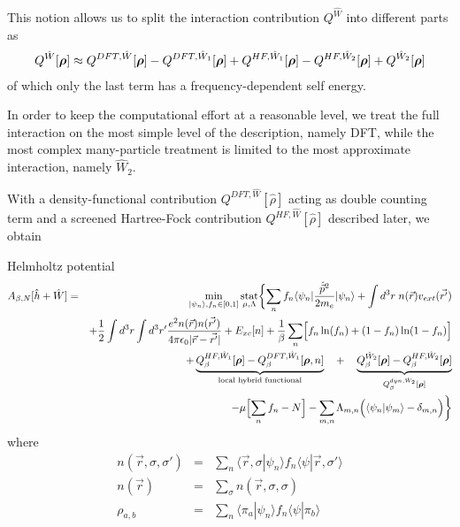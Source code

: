 \documentclass[11pt,a4paper]{report}
\begin{document}
This notion allows us to split the interaction contribution
$Q^{\hat{W}}$ into different parts as
\begin{eqnarray}
Q^{\hat{W}}[\bm{\rho}]
\approx Q^{DFT,\hat{W}}[\bm{\rho}]-Q^{DFT,\hat{W}_1}[\bm{\rho}]
+Q^{HF,\hat{W}_1}[\bm{\rho}]-Q^{HF,\hat{W}_2}[\bm{\rho}]
+Q^{\hat{W}_2}[\bm{\rho}]
\end{eqnarray}
of which only the last term has a frequency-dependent self energy.

In order to keep the computational effort at a reasonable level, we
treat the full interaction on the most simple level of the
description, namely DFT, while the most complex many-particle
treatment is limited to the most approximate interaction, namely
$\hat{W}_2$. 


With a density-functional contribution $Q^{DFT,\hat{W}}[\hat{\rho}]$
acting as double counting term and a screened Hartree-Fock
contribution $Q^{HF,\hat{W}}[\hat{\rho}]$ described later, we obtain
\begin{myshadowminipage}{Helmholtz potential}
\begin{eqnarray}
A_{\beta,N}[\hat{h}+\hat{W}]
&=&\min_{|\psi_n\rangle,f_n\in[0,1]}\operatorname*{stat}_{\mu,\Lambda}
\biggl\lbrace
\sum_n f_n\langle\psi_n|\frac{\hat{\vec{p}}^2}{2m_e}|\psi_n\rangle
+\int d^3r\;n(\vec{r})v_{ext}(\vec{r'})
\nonumber\\
&&+\frac{1}{2}\int d^3r\int d^3r'
\frac{e^2n(\vec{r})n(\vec{r'})}{4\pi\epsilon_0|\vec{r}-\vec{r'}|}
+E_{xc}[n]
+\frac{1}{\beta}\sum_n\Bigl[f_n\ln(f_n)+(1-f_n)\ln(1-f_n)\Bigr]
\nonumber\\
&&+
\underbrace{Q_{\beta}^{HF,\hat{W}_1}[\bm{\rho}]
   -Q_{\beta}^{DFT,\hat{W}_1}[\bm{\rho},n]}_{\text{local hybrid functional}}
\quad+\quad
\underbrace{Q_{\beta}^{\hat{W}_2}[\bm{\rho}]
-Q_{\beta}^{HF,\hat{W}_2}[\bm{\rho}]}
_{Q_{\beta}^{dyn,\hat{W}_2}[\bm{\rho}]}
\nonumber\\
&&
-\mu\Bigl[\sum_n f_n-N\Bigr]
-\sum_{m,n}\Lambda_{m,n}\Bigl(\langle\psi_n|\psi_m\rangle-\delta_{m,n}\Bigr)
\biggr\rbrace
\label{eq:hp}
\end{eqnarray}
where 
\begin{eqnarray}
n(\vec{r},\sigma,\sigma')&=&
\sum_n\langle\vec{r},\sigma|\psi_n\rangle 
f_n\langle\psi|\vec{r},\sigma'\rangle 
\nonumber\\
n(\vec{r})&=&\sum_\sigma n(\vec{r},\sigma,\sigma)
\nonumber\\
\rho_{a,b}&=&\sum_n\langle\pi_a|\psi_n\rangle 
f_n\langle\psi|\pi_b\rangle 
\label{eq:denmatmatel}
\end{eqnarray}
\end{myshadowminipage}
\end{document}

